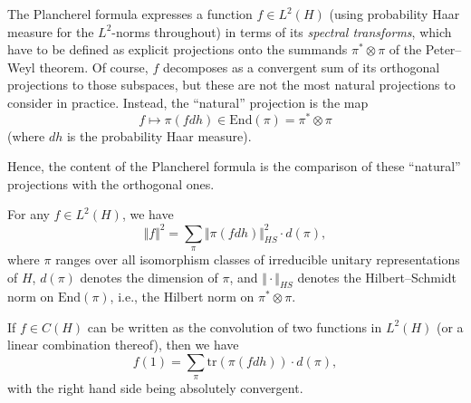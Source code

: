 The Plancherel formula expresses a function $f\in L^2(H)$ (using probability Haar measure for the $L^2$-norms throughout) in terms of its \emph{spectral transforms}, which have to be defined as explicit projections onto the summands $\pi^*\otimes \pi$ of the Peter--Weyl theorem. Of course, $f$ decomposes as a convergent sum of its orthogonal projections to those subspaces, but these are not the most natural projections to consider in practice. Instead, the ``natural'' projection is the map
$$ f\mapsto \pi(f dh) \in \text{End}(\pi) = \pi^*\otimes \pi$$
(where $dh$ is the probability Haar measure). 

Hence, the content of the Plancherel formula is the comparison of these ``natural'' projections with the orthogonal ones.

\begin{theorem}
 \label{theorem-Plancherel}
For any $f\in L^2(H)$, we have 
\begin{equation}
 \label{equation-Plancherelformula}
\Vert f\Vert^2 = \sum_\pi \Vert \pi(fdh) \Vert_{HS}^2 \cdot d(\pi),
\end{equation}
 where $\pi$ ranges over all isomorphism classes of irreducible unitary representations of $H$, $d(\pi)$ denotes the dimension of $\pi$, and $\Vert \cdot \Vert_{HS}$ denotes the Hilbert--Schmidt norm on $\text{End}(\pi)$, i.e., the Hilbert norm on $\pi^*\otimes \pi$.
 
 If $f\in C(H)$ can be written as the convolution of two functions in $L^2(H)$ (or a linear combination thereof), then we have 
\begin{equation}
 \label{equation-Plancherelformula-trace}
f(1) = \sum_\pi \text{tr}\left( \pi(fdh) \right) \cdot d(\pi),
\end{equation}
with the right hand side being absolutely convergent.
\end{theorem}

